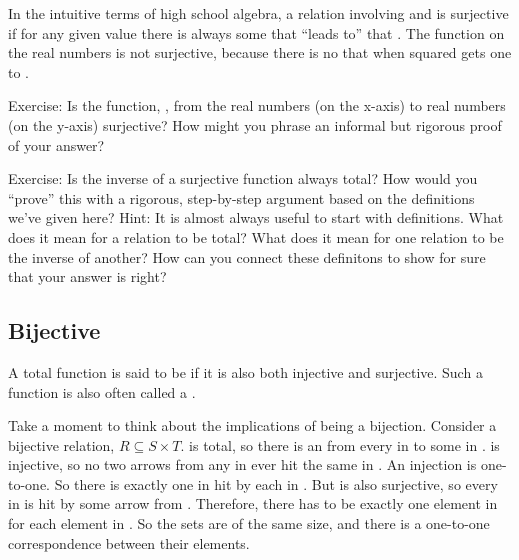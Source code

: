 \documentclass[letterpaper,10pt,english]{sphinxmanual}
\begin{document}
In the intuitive terms of high school algebra, a relation involving
 and  is surjective if for any given  value there is always
some  that “leads to” that . The  function on the real
numbers is not surjective, because there is no  that when squared
gets one to .

Exercise: Is the function, , from the real numbers (on
the x-axis) to real numbers (on the y-axis) surjective? How might you
phrase an informal but rigorous proof of your answer?

Exercise: Is the inverse of a surjective function always total? How
would you “prove” this with a rigorous, step-by-step argument based on
the definitions we’ve given here? Hint: It is almost always useful to
start with definitions. What does it mean for a relation to be total?
What does it mean for one relation to be the inverse of another? How
can you connect these definitons to show for sure that your answer is
right?


\subsection{Bijective}
\label{\detokenize{07-set-theory:bijective}}
A total function is said to be  if it is also both injective
and surjective. Such a function is also often called a .

Take a moment to think about the implications of being a bijection.
Consider a bijective relation, \(R \subseteq S \times T.\)  is
total, so there is an  from every  in  to some  in
.   is injective, so no two arrows from any  in  ever hit
the same  in . An injection is one-to-one. So there is exactly
one  in  hit by each  in . But  is also surjective, so
every  in  is hit by some arrow from . Therefore, there has
to be exactly one element in  for each element in . So the sets
are of the same size, and there is a one-to-one correspondence between
their elements.
\end{document}
